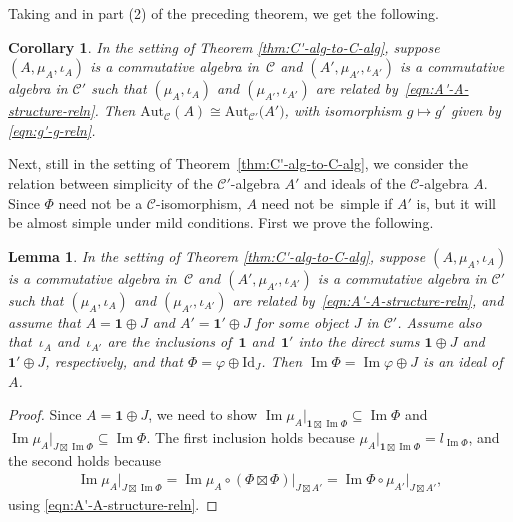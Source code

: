 \documentclass[pdftex]{sigma}
\numberwithin{equation}{section}
\newtheorem{Corollary}[Theorem]{Corollary}
\newtheorem{Lemma}[Theorem]{Lemma}
\theoremstyle{definition}
\begin{document}
Taking  and  in part (2) of the preceding theorem, we get the following.

\begin{Corollary}\label{cor:Aug-gps-iso}
In the setting of Theorem {\rm\ref{thm:C'-alg-to-C-alg}}, suppose $(A,\mu_A,\iota_A)$ is a commutative algebra in~$\mathcal{C}$ and $(A',\mu_{A'},\iota_{A'})$ is a commutative algebra in $\mathcal{C}'$ such that $(\mu_{A},\iota_{A})$ and $(\mu_{A'},\iota_{A'})$ are related by~\eqref{eqn:A'-A-structure-reln}. Then $\mathrm{Aut}_\mathcal{C}(A)\cong\mathrm{Aut}_{\mathcal{C}'}\bigl(A'\bigr)$, with isomorphism $g\mapsto g'$ given by \eqref{eqn:g'-g-reln}.
\end{Corollary}

Next, still in the setting of Theorem~\ref{thm:C'-alg-to-C-alg}, we consider the relation between simplicity of the $\mathcal{C}'$-algebra $A'$ and ideals of the $\mathcal{C}$-algebra $A$. Since $\Phi$ need not be a $\mathcal{C}$-isomorphism, $A$ need not be~simple if $A'$ is, but it will be almost simple under mild conditions. First we prove the following.
\begin{Lemma}\label{lem:im-phi+J-ideal}
In the setting of Theorem {\rm\ref{thm:C'-alg-to-C-alg}}, suppose $(A,\mu_A,\iota_A)$ is a commutative algebra in~$\mathcal{C}$ and $(A',\mu_{A'},\iota_{A'})$ is a commutative algebra in $\mathcal{C}'$ such that $(\mu_{A},\iota_{A})$ and $(\mu_{A'},\iota_{A'})$ are related by~\eqref{eqn:A'-A-structure-reln}, and assume that $A=\mathbf{1}\oplus J$ and $A'=\mathbf{1}'\oplus J$ for some object $J$ in $\mathcal{C}'$. Assume also that~$\iota_A$ and~$\iota_{A'}$ are the inclusions of~$\mathbf{1}$ and~$\mathbf{1}'$ into the direct sums $\mathbf{1}\oplus J$ and $\mathbf{1}'\oplus J$, respectively, and that $\Phi=\varphi\oplus\mathrm{Id}_J$. Then $\operatorname{Im} \Phi=\operatorname{Im} \varphi\oplus J$ is an ideal of $A$.
\end{Lemma}
\begin{proof}
Since $A=\mathbf{1}\oplus J$, we need to show $\operatorname{Im} \mu_A\vert_{\mathbf{1}\boxtimes\operatorname{Im} \Phi}\subseteq\operatorname{Im} \Phi$ and $\operatorname{Im} \mu_A\vert_{J\boxtimes\operatorname{Im} \Phi}\subseteq\operatorname{Im} \Phi$. The first inclusion holds because $\mu_A\vert_{\mathbf{1}\boxtimes\operatorname{Im} \Phi} =l_{\operatorname{Im} \Phi}$, and the second holds because
\begin{gather*}
\operatorname{Im} \mu_A\vert_{J\boxtimes\operatorname{Im} \Phi} =\operatorname{Im} \mu_A\circ(\Phi\boxtimes\Phi)\vert_{J\boxtimes A'} =\operatorname{Im} \Phi\circ\mu_{A'}\vert_{J\boxtimes A'},
\end{gather*}
using \eqref{eqn:A'-A-structure-reln}.
\end{proof}
\end{document}
